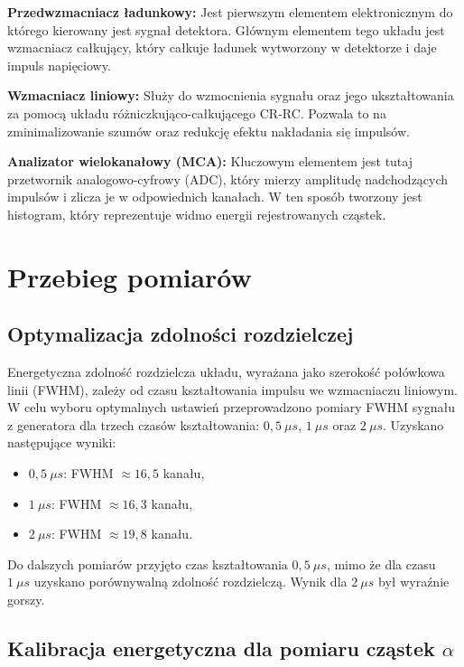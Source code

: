 \documentclass[a4paper,12pt]{article}
\begin{document}
\noindent
\textbf{Przedwzmacniacz ładunkowy:} Jest pierwszym elementem elektronicznym do którego kierowany jest sygnał detektora. Głównym elementem tego układu jest wzmacniacz całkujący, który całkuje ładunek wytworzony w detektorze i daje impuls napięciowy.

\noindent
\textbf{Wzmacniacz liniowy:} Służy do wzmocnienia sygnału oraz jego ukształtowania za pomocą układu różniczkująco-całkującego CR-RC. Pozwala to na zminimalizowanie szumów oraz redukcję efektu nakładania się impulsów.

\noindent
\textbf{Analizator wielokanałowy (MCA):} Kluczowym elementem jest tutaj przetwornik analogowo-cyfrowy (ADC), który mierzy amplitudę nadchodzących impulsów i zlicza je w odpowiednich kanałach. W ten sposób tworzony jest histogram, który reprezentuje widmo energii rejestrowanych cząstek.


\section{Przebieg pomiarów}

\subsection{Optymalizacja zdolności rozdzielczej}

Energetyczna zdolność rozdzielcza układu, wyrażana jako szerokość połówkowa linii (FWHM), zależy od czasu kształtowania impulsu we wzmacniaczu liniowym. W celu wyboru optymalnych ustawień przeprowadzono pomiary FWHM sygnału z generatora dla trzech czasów kształtowania: $0,5~\mu s$, $1~\mu s$ oraz $2~\mu s$. Uzyskano następujące wyniki:
\begin{itemize}
    \item $0,5~\mu s$: FWHM $\approx 16,5$ kanału,
    \item $1~\mu s$: FWHM $\approx 16,3$ kanału,
    \item $2~\mu s$: FWHM $\approx 19,8$ kanału.
\end{itemize}

Do dalszych pomiarów przyjęto czas kształtowania $0,5~\mu s$, mimo że dla czasu $1~\mu s$ uzyskano porównywalną zdolność rozdzielczą. Wynik dla $2~\mu s$ był wyraźnie gorszy.

\subsection{Kalibracja energetyczna dla pomiaru cząstek \texorpdfstring{$\alpha$}{alfa}}
\end{document}
